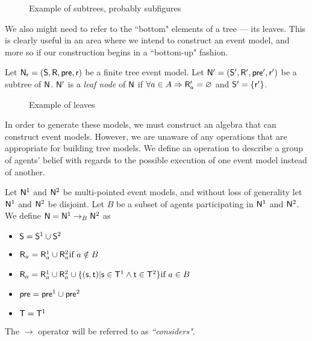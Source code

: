 \begin{figure}
	\centering
	\FIXME
	\caption{Example of subtrees, probably subfigures}
	\label{figure:subtreeExample}
\end{figure}

We also might need to refer to the ``bottom" elements of a tree --- its leaves.
This is clearly useful in an area where we intend to construct an event model, and more so if our
construction begins in a ``bottom-up" fashion.

\begin{defn} \label{leaf}
Let $\mathrm{\mathsf{N}}_\mathrm{\mathsf{r}} = (\mathrm{\mathsf{S}}, \mathrm{\mathsf{R}}, \mathrm{\mathsf{pre}}, \mathrm{\mathsf{r}})$ be a finite tree event model.
Let $\mathrm{\mathsf{N}}' = (\mathrm{\mathsf{S}}', \mathrm{\mathsf{R}}', \mathrm{\mathsf{pre}}', \mathrm{\mathsf{r}}')$ be a subtree of $\mathrm{\mathsf{N}}$.
$\mathrm{\mathsf{N}}'$ is a {\em leaf node} of $\mathrm{\mathsf{N}}$ if $\forall a \in A \Rightarrow \mathrm{\mathsf{R}}'_a = \varnothing$ and $\mathrm{\mathsf{S}}' = \{
\mathrm{\mathsf{r}}'\}$.
\end{defn}

\begin{figure}
	\centering
	\FIXME
	\caption{Example of leaves}
	\label{figure:exampleLeaves}
\end{figure}

In order to generate these models, we must construct an algebra that can construct event models.
However, we are unaware of any operations that are appropriate for building tree models.
We define an operation to describe a group of agents' belief with regards to the possible execution
of one event model instead of another.

\begin{defn} \label{considers}
Let $\mathrm{\mathsf{N}}^1$ and $\mathrm{\mathsf{N}}^2$ be multi-pointed event models, and without loss of
generality let $\mathrm{\mathsf{N}}^1$ and $\mathrm{\mathsf{N}}^2$ be disjoint.
Let $B$ be a subset of agents participating in $\mathrm{\mathsf{N}}^1$ and $\mathrm{\mathsf{N}}^2$.
We define $\mathrm{\mathsf{N}} = \mathrm{\mathsf{N}}^1 \to_B \mathrm{\mathsf{N}}^2$ as 
\begin{itemize}
  \item $\mathrm{\mathsf{S}} = \mathrm{\mathsf{S}}^1 \cup \mathrm{\mathsf{S}}^2$
  \item $\mathrm{\mathsf{R}}_a = \mathrm{\mathsf{R}}^1_a \cup \mathrm{\mathsf{R}}^2_a \text{if } a \notin B$
	\item $\mathrm{\mathsf{R}}_a =
      \mathrm{\mathsf{R}}^1_a \cup
      \mathrm{\mathsf{R}}^2_a \cup
      \{(\mathrm{\mathsf{s}},\mathrm{\mathsf{t}}) | \mathrm{\mathsf{s}} \in \mathrm{\mathsf{T}}^1 \land \mathrm{\mathsf{t}} \in \mathrm{\mathsf{T}}^2 \}
    \text{if } a \in B $
  \item $\mathrm{\mathsf{pre}} = \mathrm{\mathsf{pre}}^1 \cup \mathrm{\mathsf{pre}}^2$
  \item $\mathrm{\mathsf{T}} = \mathrm{\mathsf{T}}^1$
\end{itemize}
The $\to$ operator will be referred to as {\em ``considers"}.
\end{defn}

